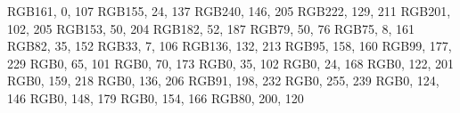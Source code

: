 \definecolor{RedViolet}         {RGB}{161, 0, 107} 	    %
\definecolor{Fuchsia}           {RGB}{155, 24, 137} 	%
\definecolor{Lavender}          {RGB}{240, 146, 205} 	%
\definecolor{Thistle}           {RGB}{222, 129, 211} 	%
\definecolor{Orchid}            {RGB}{201, 102, 205} 	%
\definecolor{DarkOrchid}        {RGB}{153, 50, 204} 	%
\definecolor{Purple}            {RGB}{182, 52, 187} 	%
\definecolor{Plum}              {RGB}{79, 50, 76} 	    %
\definecolor{Violet}            {RGB}{75, 8, 161} 	    %
\definecolor{RoyalPurple}       {RGB}{82, 35, 152} 	    %
\definecolor{BlueViolet}        {RGB}{33, 7, 106} 	    %
\definecolor{Periwinkle}        {RGB}{136, 132, 213} 	%
\definecolor{CadetBlue}	  	    {RGB}{95, 158, 160} 	%
\definecolor{CornflowerBlue}  	 {RGB}{99, 177, 229} 	%
\definecolor{MidnightBlue}	  	{RGB}{0, 65, 101} 	    %
\definecolor{NavyBlue}          {RGB}{0, 70, 173}       %
\definecolor{RoyalBlue}         {RGB}{0, 35, 102}       %
\definecolor{Blue}              {RGB}{0, 24, 168}       %
\definecolor{Cerulean}          {RGB}{0, 122, 201}      %
\definecolor{Cyan}              {RGB}{0, 159, 218}      %
\definecolor{ProcessBlue}       {RGB}{0, 136, 206}      %
\definecolor{SkyBlue}           {RGB}{91, 198, 232}     %
\definecolor{Turquoise}         {RGB}{0, 255, 239} 	    %
\definecolor{TealBlue}          {RGB}{0, 124, 146} 	    %
\definecolor{Aquamarine}        {RGB}{0, 148, 179} 	    %
\definecolor{BlueGreen}         {RGB}{0, 154, 166} 	    %
\definecolor{Emerald}           {RGB}{80, 200, 120} 	%
